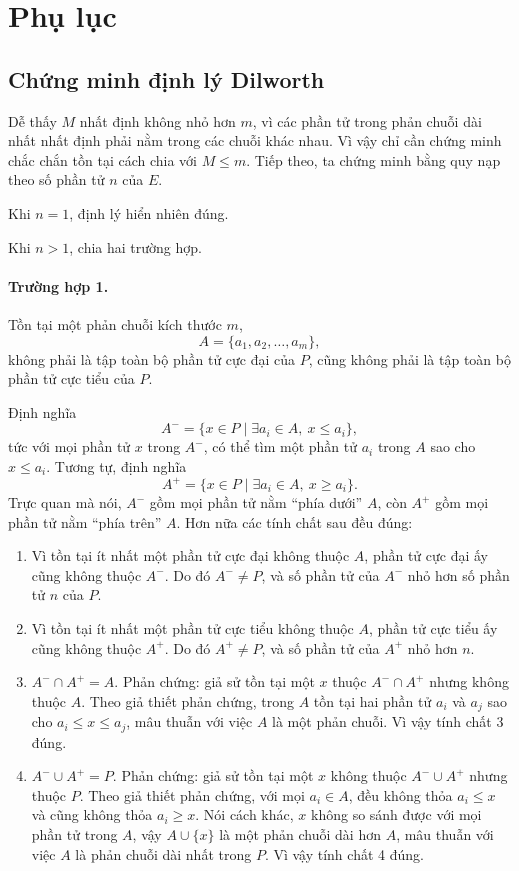 \documentclass[11pt]{article}
\begin{document}
\section{Phụ lục}

\subsection{Chứng minh định lý Dilworth}

Dễ thấy \(M\) nhất định không nhỏ hơn \(m\), vì các phần tử trong phản chuỗi
dài nhất nhất định phải nằm trong các chuỗi khác nhau. Vì vậy chỉ cần chứng
minh chắc chắn tồn tại cách chia với \(M\le m\). Tiếp theo, ta chứng minh bằng
quy nạp theo số phần tử \(n\) của \(E\).

Khi \(n=1\), định lý hiển nhiên đúng.

Khi \(n>1\), chia hai trường hợp.

\paragraph{Trường hợp 1.}
Tồn tại một phản chuỗi kích thước \(m\),
\[
  A=\{a_1,a_2,\ldots,a_m\},
\]
không phải là tập toàn bộ phần tử cực đại của \(P\), cũng không phải là tập
toàn bộ phần tử cực tiểu của \(P\).

Định nghĩa
\[
  A^-=\{x\in P\mid \exists a_i\in A,\ x\le a_i\},
\]
tức với mọi phần tử \(x\) trong \(A^-\), có thể tìm một phần tử \(a_i\) trong
\(A\) sao cho \(x\le a_i\). Tương tự, định nghĩa
\[
  A^+=\{x\in P\mid \exists a_i\in A,\ x\ge a_i\}.
\]
Trực quan mà nói, \(A^-\) gồm mọi phần tử nằm ``phía dưới'' \(A\), còn \(A^+\)
gồm mọi phần tử nằm ``phía trên'' \(A\). Hơn nữa các tính chất sau đều đúng:
\begin{enumerate}
  \item Vì tồn tại ít nhất một phần tử cực đại không thuộc \(A\), phần tử cực
  đại ấy cũng không thuộc \(A^-\). Do đó \(A^-\ne P\), và số phần tử của
  \(A^-\) nhỏ hơn số phần tử \(n\) của \(P\).
  \item Vì tồn tại ít nhất một phần tử cực tiểu không thuộc \(A\), phần tử cực
  tiểu ấy cũng không thuộc \(A^+\). Do đó \(A^+\ne P\), và số phần tử của
  \(A^+\) nhỏ hơn \(n\).
  \item \(A^-\cap A^+=A\). Phản chứng: giả sử tồn tại một \(x\) thuộc
  \(A^-\cap A^+\) nhưng không thuộc \(A\). Theo giả thiết phản chứng, trong
  \(A\) tồn tại hai phần tử \(a_i\) và \(a_j\) sao cho
  \(a_i\le x\le a_j\), mâu thuẫn với việc \(A\) là một phản chuỗi. Vì vậy tính
  chất 3 đúng.
  \item \(A^-\cup A^+=P\). Phản chứng: giả sử tồn tại một \(x\) không thuộc
  \(A^-\cup A^+\) nhưng thuộc \(P\). Theo giả thiết phản chứng, với mọi
  \(a_i\in A\), đều không thỏa \(a_i\le x\) và cũng không thỏa \(a_i\ge x\).
  Nói cách khác, \(x\) không so sánh được với mọi phần tử trong \(A\), vậy
  \(A\cup\{x\}\) là một phản chuỗi dài hơn \(A\), mâu thuẫn với việc \(A\) là
  phản chuỗi dài nhất trong \(P\). Vì vậy tính chất 4 đúng.
\end{enumerate}
\end{document}

